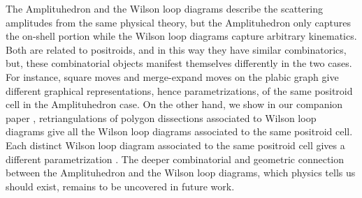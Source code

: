 \documentclass[11pt]{article}
\theoremstyle{remark}
\theoremstyle{definition}
\begin{document}
The Amplituhedron and the Wilson loop diagrams describe the scattering amplitudes from the same physical theory, but the Amplituhedron only captures the on-shell portion while the Wilson loop diagrams capture arbitrary kinematics.   Both are related to positroids, and in this way they have similar combinatorics, but, these combinatorial objects manifest themselves differently in the two cases.  For instance, square moves and merge-expand moves on the plabic graph give different graphical representations, hence parametrizations, of the same positroid cell in the Amplituhedron case.  On the other hand, we show in our companion paper \cite{generalcombinatoricsI}, retriangulations of polygon dissections associated to Wilson loop diagrams give all the Wilson loop diagrams associated to the same positroid cell.  Each distinct Wilson loop diagram associated to the same positroid cell gives a different parametrization \cite{WLDdim}. %
The deeper combinatorial and geometric connection between the Amplituhedron and the Wilson loop diagrams, which physics tells us should exist, remains to be uncovered in future work.
\end{document}
